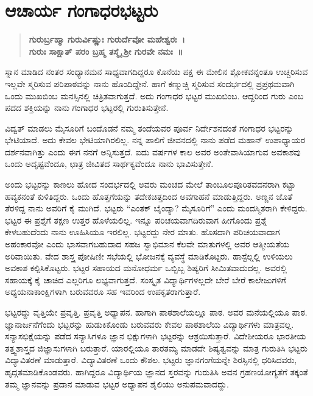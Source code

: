 \chapter{ಆಚಾರ್ಯ ಗಂಗಾಧರಭಟ್ಟರು}

\begin{center}
\smallskip
\addrule
\end{center}
\begin{verse}
\textbf{ಗುರುರ್ಬ್ರಹ್ಮಾ ಗುರುರ್ವಿಷ್ಣುಃ ಗುರುರ್ದೆವೋ ಮಹೇಶ್ವರಃ~।\\
ಗುರುಃ ಸಾಕ್ಷಾತ್ ಪರಂ ಬ್ರಹ್ಮ ತಸ್ಮೈ ಶ್ರೀ ಗುರವೇ ನಮಃ~॥}
\end{verse}
ಸ್ನಾನ ಮಾಡಿದ ನಂತರ ಸಂಧ್ಯಾನಮನ ಸಾಧ್ಯವಾಗದಿದ್ದರೂ ಕೊನೆಯ ಪಕ್ಷ ಈ ಮೇಲಿನ ಶ್ಲೋಕವನ್ನಂತೂ ಉಚ್ಚರಿಸುವ ಇಲ್ಲವೇ ಸ್ಮರಿಸುವ ಪರಿಪಾಠವನ್ನು ನಾನು ಹೊಂದಿದ್ದೇನೆ. ಹಾಗೆ ಕಣ್ಮುಚ್ಚಿ ಸ್ಮರಿಸುವ ಸಂದರ್ಭದಲ್ಲಿ ಪ್ರಪ್ರಥಮವಾಗಿ ಒಂದು ಮುಖಬಿಂಬ ಮನಸ್ಸಿನಲ್ಲಿ ಚಿತ್ರಿತವಾಗುತ್ತದೆ. ಅದು ಗಂಗಾಧರ ಭಟ್ಟರ ಮುಖಬಿಂಬ. ಆದ್ದರಿಂದ ಗುರು ಎಂಬ ಪದದ ಶಕ್ತಿಯನ್ನು ನಾನು ಗಂಗಾಧರ ಭಟ್ಟರಲ್ಲಿ ಗುರುತಿಸುತ್ತೇನೆ.

ವಿದ್ವತ್ ಮಾಡಲು ಮೈಸೂರಿಗೆ ಬಂದೊಡನೆ ನಮ್ಮ ತಂದೆಯವರ ಪೂರ್ವ ನಿರ್ದೇಶನದಂತೆ ಗಂಗಾಧರ ಭಟ್ಟರನ್ನು ಭೇಟಿಯಾದೆ. ಅದು ಕೇವಲ ಭೇಟಿಯಾಗಿರಲಿಲ್ಲ. ನನ್ನ ಪಾಲಿಗೆ ಜೀವನದಲ್ಲಿ ನಾನು ಪಡೆದ ಮಹಾನ್ ಉಪಾಧ್ಯಾಯರ ದರ್ಶನವಾಗಿತ್ತು ಎಂದು ಈಗ ನನಗೆ ಅನ್ನಿಸುತ್ತದೆ. ಐದು ವರ್ಷಗಳ ಕಾಲ ಅವರ ಅಂತೇವಾಸಿಯಾಗುವ ಅವಕಾಶವು ಒಂದು ಅದೃಷ್ಟವೆಂದೂ, ಛಾತ್ರ ಜೀವಿತದ ಸಾರ್ಥಕ್ಯವೆಂದೂ ನಾನು ಭಾವಿಸುತ್ತೇನೆ.

ಅಂದು ಭಟ್ಟರನ್ನು ಕಾಣಲು ಹೋದ ಸಂದರ್ಭದಲ್ಲಿ ಅವರು ಮಂಚದ ಮೇಲೆ ತಾಂಬೂಲಪೂರಿತವದನರಾಗಿ ಕಟ್ಟಾ ಹವ್ಯಕನಂತೆ ಕುಳಿತಿದ್ದರು. ಒಂದು ಹೊತ್ತಗೆಯನ್ನು ತದೇಕಚಿತ್ತದಿಂದ ಅವಗಾಹನೆ ಮಾಡುತ್ತಿದ್ದರು. ಅಣ್ಣನ ಜೊತೆ ತೆರಳಿದ್ದ ನಾನು ಅವರಿಗೆ ಕೈ ಮುಗಿದೆ. ಭಟ್ಟರು “ಎಂತಕ್ ಬೈಂದ್ಯಾ? ಮೈಸೂರಿಗೆ” ಎಂದು ಮಂದಸ್ಮಿತರಾಗಿ ಕೇಳಿದ್ದರು. ಭಟ್ಟರ ಈ ಪ್ರಶ್ನೆಗೆ ತಕ್ಷಣ ಉತ್ತರ ಹೊಳೆಯಲಿಲ್ಲ. ಇನ್ನೂ ಪರಿಚಯವಾಗದಿರುವಾಗ ಹೀಗೊಂದು ಪ್ರಶ್ನೆ ಕೇಳಬಹುದೆಂದು ನಾನು ಊಹಿಸಿಯೂ ಇರಲಿಲ್ಲ. ಭಟ್ಟರದ್ದು ನೇರ ಮಾತು. ಹೊಸದಾಗಿ ಪರಿಚಯವಾದಾಗ ಅಹಂಕಾರವೋ ಎಂದು ಭಾಸವಾಗಬಹುದಾದ ಸಹಜ ಸ್ವಾಭಿಮಾನ ಕೆಲವೇ ಮಾತುಗಳಲ್ಲಿ ಅವರ ಆತ್ಮೀಯತೆಯ ಅರಿವಾಯಿತು. ವೇದ ಶಾಸ್ತ್ರ ಪೋಷಿಣೀ ಸಭೆಯಲ್ಲಿ ಭೋಜನಕ್ಕೆ ವ್ಯವಸ್ಥೆ ಮಾಡಿಕೊಟ್ಟರು. ಹಾಸ್ಟೆಲ್ನಲ್ಲಿ ಉಳಿಯಲು ಅವಕಾಶ ಕಲ್ಪಿಸಿಕೊಟ್ಟರು. ಭಟ್ಟರ ಸಹಾಯದ ಮನೋಧರ್ಮ ಒಬ್ಬಿಬ್ಬ ಶಿಷ್ಯರಿಗೆ ಸೀಮಿತವಾದುದಲ್ಲ. ಅವರಲ್ಲಿ ಸಹಾಯಕ್ಕೆ ಕೈ ಚಾಚಿದ ಎಲ್ಲರಿಗೂ ಲಭ್ಯವಾಗುತ್ತದೆ. ಸಂಸ್ಕೃತ ವಿದ್ಯಾರ್ಥಿಗಳಲ್ಲದೇ ಬೇರೆ ಬೇರೆ ಕಾಲೇಜುಗಳಿಗೆ ಅಧ್ಯಯನಾಕಾಂಕ್ಷಿಗಳಾಗಿ ಬರುವವರೂ ಸಹ ಇವರಿಂದ ಉಪಕೃತರಾಗುತ್ತಾರೆ.

ಭಟ್ಟರದ್ದು ವೃತ್ತಿಯೇ ಪ್ರವೃತ್ತಿ. ಪ್ರವೃತ್ತಿ ಅಧ್ಯಾಪನ. ಹಾಗಾಗಿ ಪಾಠಶಾಲೆಯಲ್ಲೂ ಪಾಠ. ಅವರ ಮನೆಯಲ್ಲಿಯೂ ಪಾಠ. ಜ್ಞಾನಾರ್ಜನೆಗೆಂದು ಭಟ್ಟರನ್ನು ಹುಡುಕಿಕೊಂಡು ಬರುವವರು ಕೇವಲ ಪಾಠಶಾಲೆಯ ವಿದ್ಯಾರ್ಥಿಗಳು ಮಾತ್ರವಲ್ಲ. ಸನ್ಯಾಸಭಿಕ್ಷೆಯನ್ನು ಪಡೆದ ಸನ್ಯಾಸಿಗಳೂ ಜ್ಞಾನ ಭಿಕ್ಷುಗಳಾಗಿ ಭಟ್ಟರನ್ನು ಆಶ್ರಯಿಸುತ್ತಾರೆ. ವಿದೇಶೀಯರೂ ಭಾರತೀಯ ತತ್ತ್ವಶಾಸ್ತ್ರದ ಜಿಜ್ಞಾಸುಗಳಾಗಿ ಬರುತ್ತಾರೆ. ಯಾರಲ್ಲಿಯೂ ತಾರತಮ್ಯ ಮಾಡದೇ ಶಿಷ್ಯತ್ವವನ್ನು ಮಾತ್ರ ಗುರುತಿಸಿ ಭಟ್ಟರು ವಿದ್ಯಾವಿತರಣೆ ಮಾಡುತ್ತಾರೆ. ವಿದ್ಯಾವಿತರಣೆ ಒಂದು ಕೌಶಲ. ಭಟ್ಟರು ಜ್ಞಾನಗಂಗೆಯನ್ನೇ ಶಿರಸ್ಸಿನಲ್ಲಿ ಧರಿಸಿದವರು, ಹೃದ್ಗತಮಾಡಿಕೊಂಡವರು. ಹಾಗಿದ್ದರೂ ವಿದ್ಯಾರ್ಥಿಯ ಜ್ಞಾನದ ಸ್ತರವನ್ನು ಗುರುತಿಸಿ ಅವನ ಗ್ರಹಣಯೋಗ್ಯತೆಗೆ ತಕ್ಕಂತೆ ತಮ್ಮ ಜ್ಞಾನವನ್ನು ಪ್ರದಾನ ಮಾಡುವ ಭಟ್ಟರ ಅಧ್ಯಾಪನ ಶೈಲಿಯು ಅನುಪಮವಾದದ್ದು.

